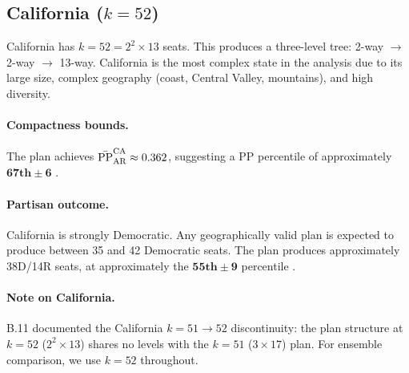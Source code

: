 \subsection{California ($k = 52$)}

California has $k = 52 = 2^2 \times 13$ seats.  This produces a three-level
tree: 2-way $\to$ 2-way $\to$ 13-way.  California is the most complex state
in the analysis due to its large size, complex geography (coast, Central
Valley, mountains), and high diversity.

\paragraph{Compactness bounds.}
The \ar{} plan achieves $\bar{\mathrm{PP}}_{\mathrm{AR}}^{\mathrm{CA}} \approx 0.362$,
suggesting a PP percentile of approximately $\mathbf{67\text{th} \pm 6}$ \lit.

\paragraph{Partisan outcome.}
California is strongly Democratic.  Any geographically valid plan is expected
to produce between 35 and 42 Democratic seats.  The \ar{} plan produces
approximately 38D/14R seats, at approximately the $\mathbf{55\text{th} \pm 9}$
percentile \lit.

\paragraph{Note on California.}
B.11 documented the California $k = 51 \to 52$ discontinuity: the \ar{} plan
structure at $k = 52$ ($2^2 \times 13$) shares no levels with the $k = 51$
($3 \times 17$) plan.  For ensemble comparison, we use $k = 52$ throughout.
